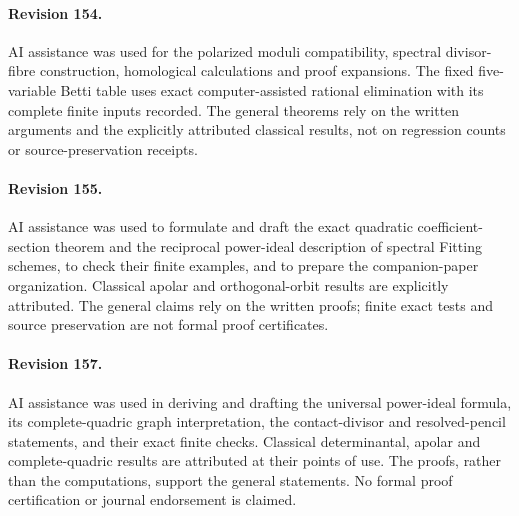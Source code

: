 \documentclass[11pt,reqno]{amsart}
\numberwithin{equation}{section}
\theoremstyle{definition}\newtheorem{definition}[theorem]{Definition}
\theoremstyle{remark}\newtheorem{remark}[theorem]{Remark}
\begin{document}
\paragraph{Revision 154.}
AI assistance was used for the polarized moduli compatibility,
spectral divisor-fibre construction, homological calculations and
proof expansions. The fixed five-variable Betti table uses exact
computer-assisted rational elimination with its complete finite
inputs recorded. The general theorems rely on the written arguments
and the explicitly attributed classical results, not on regression
counts or source-preservation receipts.

\paragraph{Revision 155.}
AI assistance was used to formulate and draft the exact quadratic
coefficient-section theorem and the reciprocal power-ideal description
of spectral Fitting schemes, to check their finite examples, and to
prepare the companion-paper organization.  Classical apolar and
orthogonal-orbit results are explicitly attributed.  The general
claims rely on the written proofs; finite exact tests and source
preservation are not formal proof certificates.

\paragraph{Revision 157.}
AI assistance was used in deriving and drafting the universal power-ideal
formula, its complete-quadric graph interpretation, the contact-divisor
and resolved-pencil statements, and their exact finite checks. Classical
determinantal, apolar and complete-quadric results are attributed at their
points of use. The proofs, rather than the computations, support the
general statements. No formal proof certification or journal endorsement
is claimed.
\end{document}

